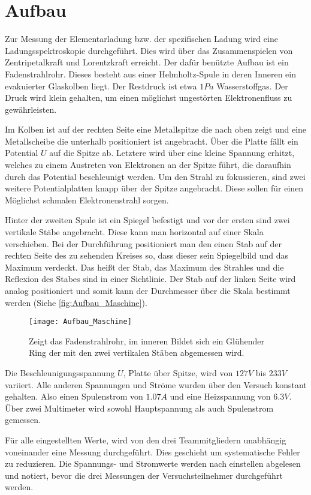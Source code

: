 
\section{Aufbau}

Zur Messung der Elementarladung bzw. der spezifischen Ladung wird eine Ladungsspektroskopie durchgeführt. Dies wird über das Zusammenspielen von Zentripetalkraft und Lorentzkraft erreicht. Der dafür benützte Aufbau ist ein Fadenstrahlrohr.  Dieses besteht aus einer Helmholtz-Spule in deren Inneren ein evakuierter Glaskolben liegt. Der Restdruck ist etwa $1 \unit{Pa}$ Wasserstoffgas. Der Druck wird klein gehalten, um einen möglichst ungestörten Elektronenfluss zu gewährleisten. 

Im Kolben ist auf der rechten Seite eine Metallspitze die nach oben zeigt und eine Metallscheibe die unterhalb positioniert ist angebracht. Über die Platte fällt ein Potential $U$ auf die Spitze ab. Letztere wird über eine kleine Spannung erhitzt, welches zu einem Austreten von Elektronen an der Spitze führt, die daraufhin durch das Potential beschleunigt werden. Um den Strahl zu fokussieren, sind zwei weitere Potentialplatten knapp über der Spitze angebracht. Diese sollen für einen Möglichst schmalen Elektronenstrahl sorgen. 

Hinter der zweiten Spule ist ein Spiegel befestigt und vor der ersten sind zwei vertikale Stäbe angebracht. 
Diese kann man horizontal auf einer Skala verschieben. Bei der Durchführung positioniert man den einen Stab auf der rechten Seite des zu sehenden Kreises so, dass dieser sein Spiegelbild und das Maximum verdeckt. Das heißt der Stab, das Maximum des Strahles und die Reflexion des Stabes sind in einer Sichtlinie. Der Stab auf der linken Seite wird analog positioniert und somit kann der Durchmesser über die Skala bestimmt werden (Siehe \autoref{fig:Aufbau_Maschine}).


\begin{figure}
	\texttt{[image: Aufbau\_Maschine]}
	\caption{Zeigt das Fadenstrahlrohr, im inneren Bildet sich ein Glühender Ring der mit den zwei vertikalen Stäben abgemessen wird.}
	\label{fig:Aufbau_Maschine}
\end{figure}


Die Beschleunigungsspannung $U$, Platte über Spitze, wird von $127 \unit{V}$ bis $233 \unit{V}$ variiert. Alle anderen Spannungen und Ströme wurden über den Versuch konstant gehalten. Also einen Spulenstrom von $1.07 \unit{A}$ und eine Heizspannung von $6.3 \unit{V}$.  Über zwei Multimeter wird sowohl Hauptspannung als auch Spulenstrom gemessen. 

Für alle eingestellten Werte, wird von den drei Teammitgliedern unabhängig voneinander eine Messung durchgeführt. Dies geschieht um systematische Fehler zu reduzieren. Die Spannungs- und Stromwerte werden nach einstellen abgelesen und notiert, bevor die drei Messungen der Versuchsteilnehmer durchgeführt werden. 
